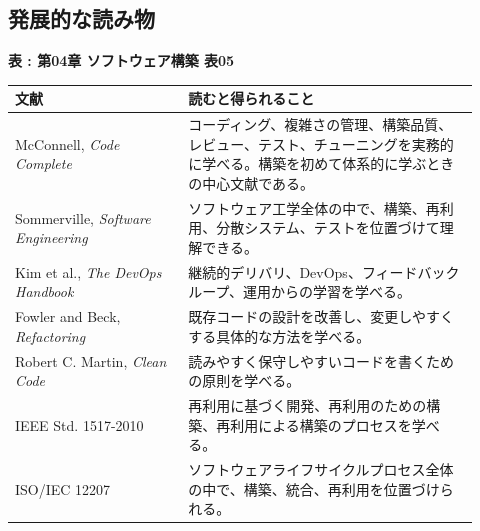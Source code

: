 \subsection{発展的な読み物}

\par\smallskip\noindent{}\label{tab:ch04-05}\textbf{表 \thetable: 第04章 ソフトウェア構築 表05}\par\smallskip
\begin{longtable}{L{0.34\linewidth}L{0.58\linewidth}}
\toprule
\textbf{文献} & \textbf{読むと得られること} \\
\midrule
McConnell, \textit{Code Complete} & コーディング、複雑さの管理、構築品質、レビュー、テスト、チューニングを実務的に学べる。構築を初めて体系的に学ぶときの中心文献である。 \\
Sommerville, \textit{Software Engineering} & ソフトウェア工学全体の中で、構築、再利用、分散システム、テストを位置づけて理解できる。 \\
Kim et al., \textit{The DevOps Handbook} & 継続的デリバリ、DevOps、フィードバックループ、運用からの学習を学べる。 \\
Fowler and Beck, \textit{Refactoring} & 既存コードの設計を改善し、変更しやすくする具体的な方法を学べる。 \\
Robert C. Martin, \textit{Clean Code} & 読みやすく保守しやすいコードを書くための原則を学べる。 \\
IEEE Std. 1517-2010 & 再利用に基づく開発、再利用のための構築、再利用による構築のプロセスを学べる。 \\
ISO/IEC 12207 & ソフトウェアライフサイクルプロセス全体の中で、構築、統合、再利用を位置づけられる。 \\
\bottomrule
\end{longtable}
